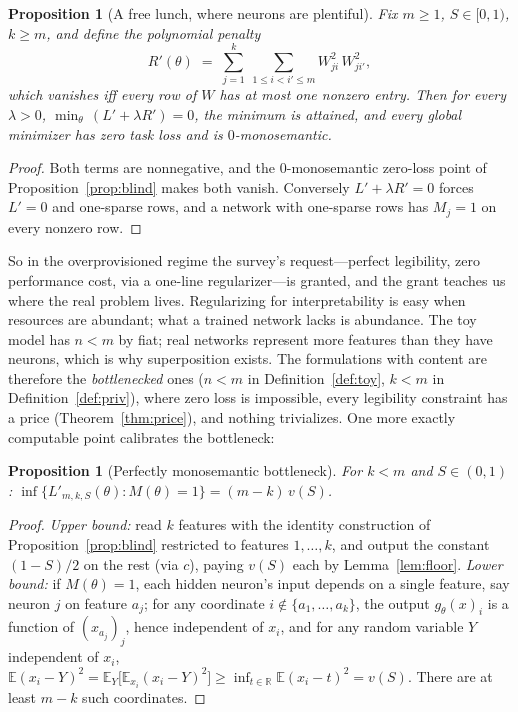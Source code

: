 \documentclass[11pt]{amsart}
\theoremstyle{plain}
\newtheorem{proposition}[theorem]{Proposition}
\theoremstyle{definition}
\newcommand{\E}{\mathbb{E}}
\newcommand{\R}{\mathbb{R}}
\begin{document}
\begin{proposition}[A free lunch, where neurons are plentiful]\label{prop:freelunch}
Fix $m\ge1$, $S\in[0,1)$, $k\ge m$, and define the polynomial penalty
\[
R'(\theta) \;=\; \sum_{j=1}^{k}\ \sum_{1\le i<i'\le m} W_{ji}^2\,W_{ji'}^2 ,
\]
which vanishes iff every row of $W$ has at most one nonzero entry. Then for every $\lambda>0$, $\min_\theta\, (L'+\lambda R')=0$, the minimum is attained, and \emph{every} global minimizer has zero task loss and is $0$-monosemantic.
\end{proposition}

\begin{proof}
Both terms are nonnegative, and the $0$-monosemantic zero-loss point of Proposition~\ref{prop:blind} makes both vanish. Conversely $L'+\lambda R'=0$ forces $L'=0$ and one-sparse rows, and a network with one-sparse rows has $M_j=1$ on every nonzero row.
\end{proof}

So in the overprovisioned regime the survey's request---perfect legibility, zero performance cost, via a one-line regularizer---is granted, and the grant teaches us where the real problem lives. Regularizing for interpretability is easy when resources are abundant; what a trained network lacks is abundance. The toy model has $n<m$ by fiat; real networks represent more features than they have neurons, which is why superposition exists. The formulations with content are therefore the \emph{bottlenecked} ones ($n<m$ in Definition~\ref{def:toy}, $k<m$ in Definition~\ref{def:priv}), where zero loss is impossible, every legibility constraint has a price (Theorem~\ref{thm:price}), and nothing trivializes. One more exactly computable point calibrates the bottleneck:

\begin{proposition}[Perfectly monosemantic bottleneck]\label{prop:monobottleneck}
For $k<m$ and $S\in(0,1)$: $\inf\{L'_{m,k,S}(\theta) : M(\theta)=1\} = (m-k)\,v(S)$.
\end{proposition}

\begin{proof}
\emph{Upper bound:} read $k$ features with the identity construction of Proposition~\ref{prop:blind} restricted to features $1,\dots,k$, and output the constant $(1-S)/2$ on the rest (via $c$), paying $v(S)$ each by Lemma~\ref{lem:floor}. \emph{Lower bound:} if $M(\theta)=1$, each hidden neuron's input depends on a single feature, say neuron $j$ on feature $a_j$; for any coordinate $i\notin\{a_1,\dots,a_k\}$, the output $g_\theta(x)_i$ is a function of $(x_{a_j})_j$, hence independent of $x_i$, and for any random variable $Y$ independent of $x_i$, $\E(x_i-Y)^2 = \E_Y\bigl[\E_{x_i}(x_i-Y)^2\bigr] \ge \inf_{t\in\R}\E(x_i-t)^2 = v(S)$. There are at least $m-k$ such coordinates.
\end{proof}
\end{document}

